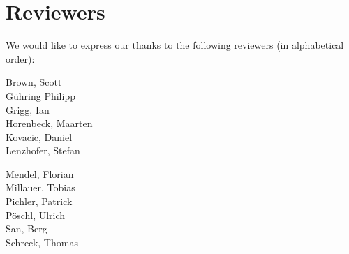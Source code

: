 \newpage
\section{Reviewers}
\label{section:Reviewers}

We would like to express our thanks to the following reviewers (in alphabetical order):


\vline{}

\begin{minipage}[b]{0.5\linewidth}
\center
Brown, Scott \\
G\"uhring Philipp  \\
Grigg, Ian  \\
Horenbeck, Maarten \\
Kovacic, Daniel \\
Lenzhofer, Stefan \\
\end{minipage}
\begin{minipage}[b]{0.5\linewidth}
\center
Mendel, Florian \\
Millauer, Tobias \\
Pichler, Patrick \\
P\"oschl, Ulrich \\
San, Berg \\
Schreck, Thomas  \\
\end{minipage}





